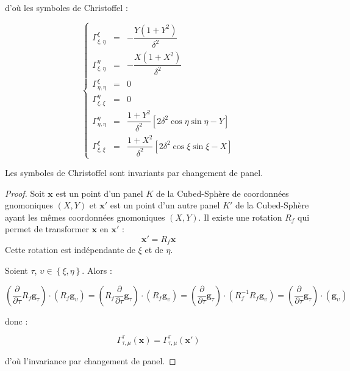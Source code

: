 d'où les symboles de Christoffel :

\begin{equation}
\left\lbrace
\begin{array}{rcl}
\Gamma_{\xi,\eta}^{\xi} & = & - \dfrac{Y ( 1+Y^2)}{\delta^2}\\
\Gamma_{\xi,\eta}^{\eta} & = & - \dfrac{X(1+X^2)}{\delta^2}\\
\Gamma_{\eta,\eta}^{\xi} & = & 0 \\
\Gamma_{\xi,\xi}^{\eta} & = & 0 \\
\Gamma_{\eta,\eta}^{\eta} & = & \dfrac{1+Y^2}{\delta^2} \left[ 2 \delta^2 \cos \eta \sin \eta - Y \right]\\
\Gamma_{\xi,\xi}^{\xi} & = & \dfrac{1+X^2}{\delta^2} \left[ 2 \delta^2 \cos \xi \sin \xi - X \right]
\end{array}
\right.
\end{equation}

\begin{proposition}
Les symboles de Christoffel sont invariants par changement de panel.
\end{proposition}

\begin{proof}
Soit $\mathbf{x}$ est un point d'un panel $K$ de la Cubed-Sphère de coordonnées gnomoniques $(X,Y)$ et $\mathbf{x}'$ est un point d'un autre panel $K'$ de la Cubed-Sphère ayant les mêmes coordonnées gnomoniques $(X,Y)$. Il existe une rotation $R_f$ qui permet de transformer $\mathbf{x}$ en $\mathbf{x}'$ :
\begin{equation}
\mathbf{x}' = R_f \mathbf{x}
\end{equation}
Cette rotation est indépendante de $\xi$ et de $\eta$.

Soient $\tau$, $\upsilon \in \left\lbrace \xi, \eta \right\rbrace$. Alors :

$$\left( \dfrac{\partial}{\partial \tau}  R_f \mathbf{g}_{\tau} \right) \cdot \left( R_f \mathbf{g}_{\upsilon} \right) = \left( R_f \dfrac{\partial}{\partial \tau}   \mathbf{g}_{\tau} \right) \cdot \left( R_f \mathbf{g}_{\upsilon} \right) =  \left( \dfrac{\partial}{\partial \tau}  \mathbf{g}_{\tau} \right) \cdot \left( R_f^{-1} R_f \mathbf{g}_{\upsilon} \right) =  \left( \dfrac{\partial}{\partial \tau}  \mathbf{g}_{\tau} \right) \cdot \left( \mathbf{g}_{\upsilon} \right)$$

donc :

$$\Gamma_{\tau, \mu}^{\tau}(\mathbf{x})=\Gamma_{\tau, \mu}^{\tau}(\mathbf{x}')$$

d'où l'invariance par changement de panel.
\end{proof}


